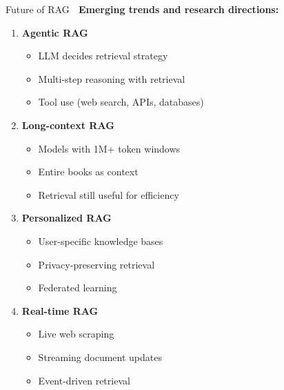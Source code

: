 \documentclass[aspectratio=169]{beamer}
\begin{document}
\begin{frame}[shrink=10]{Future of RAG 🔮}
\textbf{Emerging trends and research directions:}

\vspace{0.5em}

\begin{enumerate}\setlength{\itemsep}{0pt}
    \item \textbf{Agentic RAG}
    \begin{itemize}\setlength{\itemsep}{0pt}
        \item LLM decides retrieval strategy
        \item Multi-step reasoning with retrieval
        \item Tool use (web search, APIs, databases)
    \end{itemize}

    \item \textbf{Long-context RAG}
    \begin{itemize}\setlength{\itemsep}{0pt}
        \item Models with 1M+ token windows
        \item Entire books as context
        \item Retrieval still useful for efficiency
    \end{itemize}

    \item \textbf{Personalized RAG}
    \begin{itemize}\setlength{\itemsep}{0pt}
        \item User-specific knowledge bases
        \item Privacy-preserving retrieval
        \item Federated learning
    \end{itemize}

    \item \textbf{Real-time RAG}
    \begin{itemize}\setlength{\itemsep}{0pt}
        \item Live web scraping
        \item Streaming document updates
        \item Event-driven retrieval
    \end{itemize}
\end{enumerate}
\end{frame}
\end{document}

